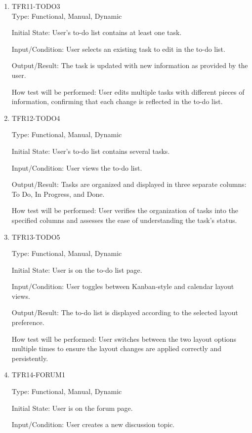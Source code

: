 \documentclass[12pt, titlepage]{article}
\begin{document}
\begin{enumerate}
\item{TFR11-TODO3\\}\label{TFR11-TODO3}
Type: Functional, Manual, Dynamic

Initial State: User's to-do list contains at least one task.

Input/Condition: User selects an existing task to edit in the to-do list.

Output/Result: The task is updated with new information as provided by the user.

How test will be performed: User edits multiple tasks with different pieces of information, confirming that each change is reflected in the to-do list.


\item{TFR12-TODO4\\}\label{TFR12-TODO4}

Type: Functional, Manual, Dynamic

Initial State: User's to-do list contains several tasks.

Input/Condition: User views the to-do list.

Output/Result: Tasks are organized and displayed in three separate columns: To Do, In Progress, and Done.

How test will be performed: User verifies the organization of tasks into the specified columns and assesses the ease of understanding the task's status.


\item{TFR13-TODO5\\}\label{TFR13-TODO5}

Type: Functional, Manual, Dynamic

Initial State: User is on the to-do list page.

Input/Condition: User toggles between Kanban-style and calendar layout views.

Output/Result: The to-do list is displayed according to the selected layout preference.

How test will be performed: User switches between the two layout options multiple times to ensure the layout changes are applied correctly and persistently.


\item{TFR14-FORUM1\\}\label{TFR14-FORUM1}

Type: Functional, Manual, Dynamic

Initial State: User is on the forum page.

Input/Condition: User creates a new discussion topic.


\end{enumerate}
\end{document}
